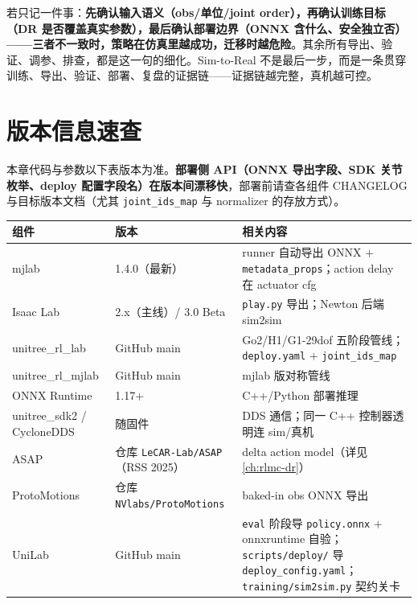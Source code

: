 \begin{insight}\label{ins:rlmc-s2r-oneliner}
若只记一件事：\textbf{先确认输入语义（obs/单位/joint order），再确认训练目标（DR 是否覆盖真实参数），最后确认部署边界（ONNX 含什么、安全独立否）——三者不一致时，策略在仿真里越成功，迁移时越危险}。其余所有导出、验证、调参、排查，都是这一句的细化。Sim-to-Real 不是最后一步，而是一条贯穿训练、导出、验证、部署、复盘的证据链——证据链越完整，真机越可控。
\end{insight}

\section*{版本信息速查}
\label{sec:rlmc-s2r-versions}

本章代码与参数以下表版本为准。\textbf{部署侧 API（ONNX 导出字段、SDK 关节枚举、deploy 配置字段名）在版本间漂移快}，部署前请查各组件 CHANGELOG 与目标版本文档（尤其 \verb|joint_ids_map| 与 normalizer 的存放方式）。

\begin{center}
\small
\begin{tabular}{@{}lll@{}}
\toprule
组件 & 版本 & 相关内容 \\
\midrule
mjlab & 1.4.0（最新） & runner 自动导出 ONNX $+$ \verb|metadata_props|；action delay 在 actuator cfg \\
Isaac Lab & 2.x（主线）/ 3.0 Beta & \verb|play.py| 导出；Newton 后端 sim2sim \\
unitree\_rl\_lab & GitHub main & Go2/H1/G1-29dof 五阶段管线；\verb|deploy.yaml| $+$ \verb|joint_ids_map| \\
unitree\_rl\_mjlab & GitHub main & mjlab 版对称管线 \\
ONNX Runtime & 1.17+ & C++/Python 部署推理 \\
unitree\_sdk2 / CycloneDDS & 随固件 & DDS 通信；同一 C++ 控制器透明连 sim/真机 \\
ASAP & 仓库 \verb|LeCAR-Lab/ASAP|（RSS 2025） & delta action model（详见 \cref{ch:rlmc-dr}） \\
ProtoMotions & 仓库 \verb|NVlabs/ProtoMotions| & baked-in obs ONNX 导出 \\
UniLab & GitHub main & \verb|eval| 阶段导 \verb|policy.onnx| $+$ onnxruntime 自验；\verb|scripts/deploy/| 导 \verb|deploy_config.yaml|；\verb|training/sim2sim.py| 契约关卡 \\
\bottomrule
\end{tabular}
\end{center}
